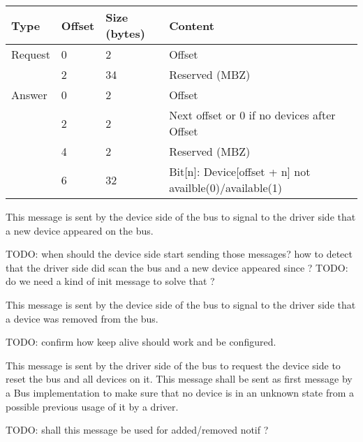 \begin{tabular}{|l|l|l|l|}
\hline
Type & Offset & Size (bytes) & Content \\
\hline \hline
Request & 0 & 2 & Offset \\
        & 2 & 34 & Reserved (MBZ) \\
\hline
Answer & 0 & 2 & Offset \\
       & 2 & 2 & Next offset or 0 if no devices after Offset \\
       & 4 & 2 & Reserved (MBZ) \\
       & 6 & 32 & Bit[n]: Device[offset + n] not availble(0)/available(1) \\
\hline
\end{tabular}


This message is sent by the device side of the bus to signal to the driver side
that a new device appeared on the bus.

TODO: when should the device side start sending those messages? how to detect
that the driver side did scan the bus and a new device appeared since ?
TODO: do we need a kind of init message to solve that ?


This message is sent by the device side of the bus to signal to the driver side
that a device was removed from the bus.


TODO: confirm how keep alive should work and be configured.


This message is sent by the driver side of the bus to request the device side
to reset the bus and all devices on it.
This message shall be sent as first message by a Bus implementation to make
sure that no device is in an unknown state from a possible previous usage of
it by a driver.

TODO: shall this message be used for added/removed notif ?

